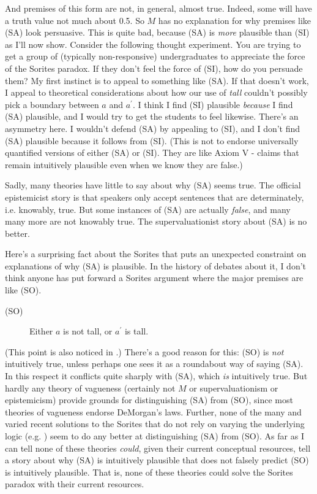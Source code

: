 \noindent And premises of this form are not, in general, almost true. Indeed, some will have a truth value not much about 0.5. So \(M\) has no explanation for why premises like (SA) look persuasive. This is quite bad, because (SA) is \textit{more} plausible than (SI) as I'll now show. Consider the following thought experiment. You are trying to get a group of (typically non-responsive) undergraduates to appreciate the force of the Sorites paradox. If they don't feel the force of (SI), how do you persuade them? My first instinct is to appeal to something like (SA). If that doesn't work, I appeal to theoretical considerations about how our use of \textit{tall} couldn't possibly pick a boundary between \(a\) and \(a ^\prime\). I think I find (SI) plausible \textit{because} I find (SA) plausible, and I would try to get the students to feel likewise. There's an asymmetry here. I wouldn't defend (SA) by appealing to (SI), and I don't find (SA) plausible because it follows from (SI). (This is not to endorse universally quantified versions of either (SA) or (SI). They are like Axiom V - claims that remain intuitively plausible even when we know they are false.)

Sadly, many theories have little to say about why (SA) seems true. The official epistemicist story is that speakers only accept sentences that are determinately, i.e. knowably, true. But some instances of (SA) are actually \textit{false}, and many many more are not knowably true. The supervaluationist story about (SA) is no better.

Here's a surprising fact about the Sorites that puts an unexpected constraint on explanations of why (SA) is plausible. In the history of debates about it, I don't think anyone has put forward a Sorites argument where the major premises are like (SO).

\begin{description}
\item [(SO)] Either \(a\) is not tall, or \(a ^\prime\) is tall.
\end{description}

\noindent (This point is also noticed in \citet{SiderBraun}.) There's a good reason for this: (SO) is \textit{not} intuitively true, unless perhaps one sees it as a roundabout way of saying (SA). In this respect it conflicts quite sharply with (SA), which \textit{is} intuitively true. But hardly any theory of vagueness (certainly not \(M\) or supervaluationism or epistemicism) provide grounds for distinguishing (SA) from (SO), since most theories of vagueness endorse DeMorgan's laws. Further, none of the many and varied recent solutions to the Sorites that do not rely on varying the underlying logic (e.g. \citet{Fara2000, Sorensen2001, Eklund2002}) seem to do any better at distinguishing (SA) from (SO). As far as I can tell none of these theories \textit{could}, given their current conceptual resources, tell a story about why (SA) is intuitively plausible that does not falsely predict (SO) is intuitively plausible. That is, none of these theories could solve the Sorites paradox with their current resources.


